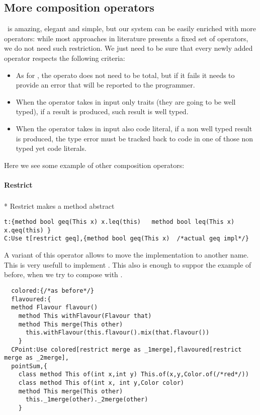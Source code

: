 \subsection{More composition operators}
\use\ is amazing, elegant and simple, but our system can be easily enriched with more 
operators: while most approaches in literature presents a fixed set of operators, we do not need such restriction.
We just need to be sure that every newly added operator respects the following criteria:

\begin{itemize}
\item As for \use, the operato does not need to be total, but if it fails it needs to provide an error that will be reported to the programmer.
\item When the operator takes in input only traits (they are going to be well typed), if a result is produced,
 such result is well typed.
\item When the operator takes in input also code literal, if a non well typed result is produced,
the type error must be tracked back to code in one of those non typed yet code literals.
 \end{itemize}


Here we see some example of other composition operators:
\paragraph*{Restrict}${}_{}$\\*
Restrict makes a method abstract
\begin{lstlisting}
t:{method bool geq(This x) x.leq(this)   method bool leq(This x) x.qeq(this) }
C:Use t[restrict geq],{method bool geq(This x)  /*actual geq impl*/}
\end{lstlisting}

A variant of this operator allows to move the implementation to another name. This is very usefull to implement \Q@super@. This also is enough to suppor the example of before, when we try to compose \Q@colored@
with \Q@flavoured@.

\begin{lstlisting}
  colored:{/*as before*/}
  flavoured:{
  method Flavour flavour()
    method This withFlavour(Flavour that)
    method This merge(This other)
      this.withFlavour(this.flavour().mix(that.flavour())
    }
  CPoint:Use colored[restrict merge as _1merge],flavoured[restrict merge as _2merge],
  pointSum,{
    class method This of(int x,int y) This.of(x,y,Color.of(/*red*/))
    class method This of(int x, int y,Color color)
    method This merge(This other)
      this._1merge(other)._2merge(other)
    }
\end{lstlisting}

